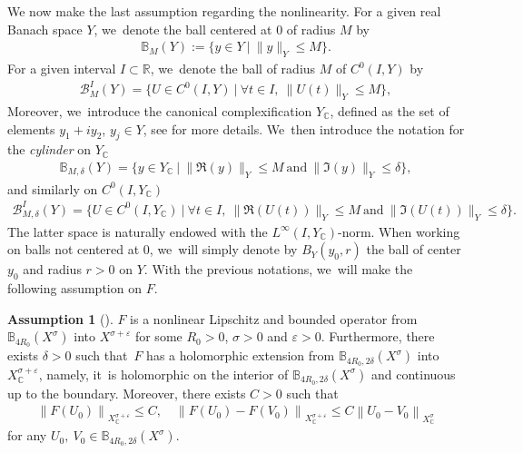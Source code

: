 \documentclass[10pt]{amsart}
\theoremstyle{definition}
\newtheorem{assum}{Assumption}
\newenvironment{assump}[2][]
{\renewcommand\theassum{#2}\begin{assum}[#1]}
{\end{assum}}
\let\mc\mathcal
\let\veps\varepsilon
\newcommand{\B}{\mc{B}}
\newcommand{\R}{\mathbb{R}}
\providecommand{\norm}[1]{\lVert#1\rVert}
\newcommand\nor[2]{\left\|#1\right\|_{#2}}
\begin{document}
We now make the last assumption regarding the nonlinearity. For a given real Banach space $Y$, we~denote the ball centered at $0$ of radius $M$ by
\begin{align*}
\mathbb{B}_M(Y):=\{y\in Y\ |\ \norm{y}_Y\leq M\}.
\end{align*}
For a given interval $I\subset \R$, we~denote the ball of radius $M$ of $C^0(I, Y)$ by
\begin{align*}
\B_{M}^I(Y)=\{U\in C^0(I, Y)\ |\ \forall t\in I,\ \norm{U(t)}_Y\leq M\},
\end{align*}
Moreover, we~introduce the canonical complexification $Y_\mathbb{C}$, defined as the set of elements $y_1+iy_2$, $y_j\in Y$, see \cite[\S 2]{BS:71-polynomials} for more details. We~then introduce the notation for the \emph{cylinder} on $Y_\mathbb{C}$
\begin{align*}
\mathbb{B}_{M, \delta}(Y)=\{y\in Y_\mathbb{C}\ |\ \norm{\Re(y)}_Y\leq M\ \text{and}\ \norm{\Im(y)}_Y\leq \delta\},
\end{align*}
and similarly on $C^0(I, Y_\mathbb{C})$
\begin{align*}
\B_{M, \delta}^I(Y)=\{U\in C^0(I, Y_\mathbb{C})\ |\ \forall t\in I,\ \norm{\Re(U(t))}_Y\leq M\ \text{and}\ \norm{\Im(U(t))}_Y\leq \delta\}.
\end{align*}
The latter space is naturally endowed with the $L^\infty(I,Y_\mathbb{C})$-norm. When working on balls not centered at $0$, we~will simply denote by $B_Y(y_0, r)$ the ball of center $y_0$ and radius $r>0$ on $Y$. With the previous notations, we~will make the following assumption on $F$.
\begin{assump}{3}
\label{assumFholom}
$F$ is a nonlinear Lipschitz and bounded operator from $\mathbb{B}_{4R_{0}}(X^{\sigma})$ into $X^{\sigma+\veps}$ for some $R_{0}>0$, $\sigma>0$ and $\veps>0$. Furthermore, there exists $\delta>0$ such that~$F$ has a holomorphic extension from $\mathbb{B}_{4R_{0},2\delta}(X^{\sigma})$ into $X^{\sigma+\veps}_{\mathbb{C}}$, namely, it~is holomorphic on the interior of $\mathbb{B}_{4R_{0},2\delta}(X^{\sigma})$ and continuous up to the boundary. Moreover, there exists $C>0$ such that
\begin{align}
\label{boundFanalyticintro}
\nor{F(U_{0})}{X^{\sigma+\veps}_{\mathbb{C}}}\leq C,\quad \nor{F(U_{0})-F(V_{0})}{X^{\sigma+\veps}_{\mathbb{C}}}\leq C \nor{U_{0}-V_{0}}{X^{\sigma}_{\mathbb{C}}}
\end{align}
for any $U_{0},~V_{0}\in \mathbb{B}_{4R_{0},2\delta}(X^{\sigma})$.
\end{assump}
\end{document}
